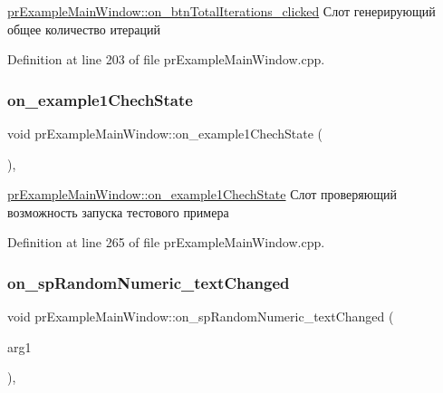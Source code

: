 \hyperlink{classpr_example_main_window_a3868049ba73b562b78b1518114bd26b0}{pr\+Example\+Main\+Window\+::on\+\_\+btn\+Total\+Iterations\+\_\+clicked} Слот генерирующий общее количество итераций 



Definition at line 203 of file pr\+Example\+Main\+Window.\+cpp.

\mbox{\label{classpr_example_main_window_a60b5693aca8b86dafbcf64d9e641822f}} 
\subsubsection{\texorpdfstring{on\+\_\+example1\+Chech\+State}{on\_example1ChechState}}
{\footnotesize\ttfamily void pr\+Example\+Main\+Window\+::on\+\_\+example1\+Chech\+State (\begin{DoxyParamCaption}{ }\end{DoxyParamCaption})\hspace{0.3cm}{\ttfamily [private]}, {\ttfamily [slot]}}



\hyperlink{classpr_example_main_window_a60b5693aca8b86dafbcf64d9e641822f}{pr\+Example\+Main\+Window\+::on\+\_\+example1\+Chech\+State} Слот проверяющий возможность запуска тестового примера 



Definition at line 265 of file pr\+Example\+Main\+Window.\+cpp.

\mbox{\label{classpr_example_main_window_a2b65976cef6b714c6310ffb7156001c0}} 
\subsubsection{\texorpdfstring{on\+\_\+sp\+Random\+Numeric\+\_\+text\+Changed}{on\_spRandomNumeric\_textChanged}}
{\footnotesize\ttfamily void pr\+Example\+Main\+Window\+::on\+\_\+sp\+Random\+Numeric\+\_\+text\+Changed (\begin{DoxyParamCaption}\item[{const Q\+String \&}]{arg1 }\end{DoxyParamCaption})\hspace{0.3cm}{\ttfamily [private]}, {\ttfamily [slot]}}



